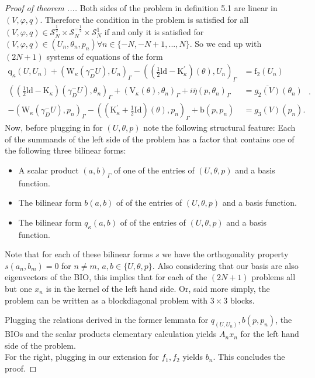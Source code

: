 \documentclass[10pt,journal,compsoc, onecolumn]{IEEEtran}
\begin{document}
\begin{proof}[Proof of theorem ...]
    Both sides of the problem in definition 5.1 are linear in $(V, \varphi, q)$. 
    Therefore the condition in the problem is satisfied for all 
    $(V, \varphi, q)\in \mathcal{S}^{\frac{1}{2}}_N  \times  \mathcal{S}^{-\frac{1}{2}}_N \times  \mathcal{S}^{1}_N$
    if and only it is satisfied for $(V, \varphi, q) \in (U_n, \theta_n, p_n) \forall n \in \{-N, -N+1, ..., N\}$.
    So we end up with $(2N + 1)$ systems of equations of the form 
    $$
    \begin{aligned}
        \mathrm{q}_{\kappa}(U, U_n)+\left(\mathrm{W}_{\kappa}\left(\gamma_{D}^{-} U\right), U_n\right)_{\Gamma}-\left((\frac{1}{2} \mathrm{ld}-\mathrm{K}_{\kappa}^{\prime})(\theta),U_n\right)_{\Gamma} &=\mathrm{f}_{2}(U_n) \\
        \left((\frac{1}{2} \mathrm{ld}-\mathrm{K}_{\kappa})\left(\gamma_{D}^{-} U\right), \theta_n\right)_{\Gamma}+\left(\mathrm{V}_{\kappa}(\theta), \theta_n\right)_{\Gamma}+i \overline{\eta}(p, \theta_n)_{\Gamma} &=\overline{g_2(V)}(\theta_n) \\
        -\left(\mathrm{W}_{\kappa}\left(\gamma_{D}^{-} U\right), p_n\right)_{\Gamma}-\left((\mathrm{K}_{\kappa}^{\prime}+\frac{1}{2} \mathrm{Id})(\theta), p_n\right)_{\Gamma}+\mathrm{b}(p, p_n) &=g_3(V)(p_n).
    \end{aligned}.
    $$
    Now, before plugging in for $(U, \theta, p)$ note the following structural feature: 
    Each of the summands of the left side of the problem has a factor that contains one of the following three bilinear forms:
    \begin{itemize}
        \item A scalar product $(a,b)_\Gamma$ of one of the entries of $(U, \theta, p)$ and a basis function. 
        \item The bilinear form $b(a,b)$ of of the entries of $(U, \theta, p)$ and a basis function. 
        \item The bilinear form $q_\kappa(a,b)$ of of the entries of $(U, \theta, p)$ and a basis function. 
    \end{itemize}
    Note that for each of these bilinear forms $s$ we have the orthogonality property $s(a_n, b_m) = 0$ for $n \neq m$, $a, b \in \{U, \theta, p\}$.
    Also considering that our basis are also eigenvectors of the BIO, this implies that for each of the $(2N + 1)$ problems all but one $x_n$ is in the kernel of the left hand side.
    Or, said more simply, the problem can be written as a blockdiagonal problem with $3 \times 3$ blocks. 

    Plugging the relations derived in the former lemmata for $q_(U, U_n), b(p, p_n)$, 
    the BIOs and the scalar products elementary calculation yields
    $A_n x_n$ for the left hand side of the problem.  \\
    For the right, plugging in our extension for $f_1, f_2$ yields $b_n$.
    This concludes the proof. 
\end{proof} 
\end{document}
